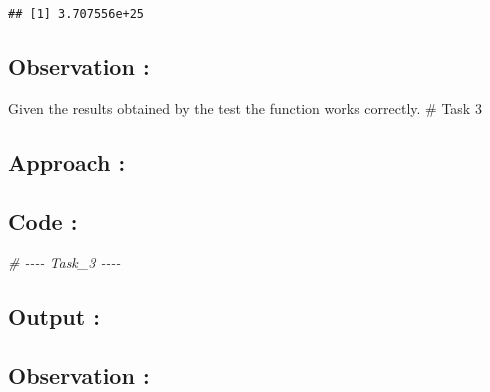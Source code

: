 \documentclass[
]{article}
\newenvironment{Shaded}{\begin{snugshade}}{\end{snugshade}}
\newcommand{\CommentTok}[1]{\textcolor[rgb]{0.56,0.35,0.01}{\textit{#1}}}
\begin{document}
\begin{verbatim}
## [1] 3.707556e+25
\end{verbatim}

\subsection{Observation :}\label{observation-1}

Given the results obtained by the test the function works correctly. \#
Task 3

\subsection{Approach :}\label{approach-2}

\subsection{Code :}\label{code-2}

\begin{Shaded}
\begin{Highlighting}[]
\CommentTok{\# {-}{-}{-}{-} Task\_3 {-}{-}{-}{-}}
\end{Highlighting}
\end{Shaded}

\subsection{Output :}\label{output-2}

\subsection{Observation :}\label{observation-2}
\end{document}
